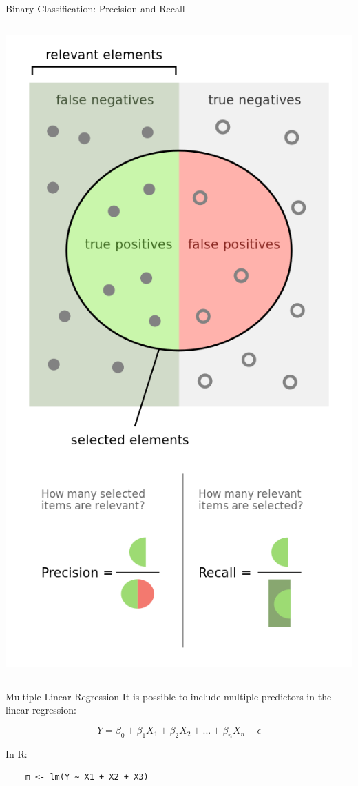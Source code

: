 \begin{frame}{Binary Classification: Precision and Recall}
\begin{columns}
\begin{column}{0.4\linewidth}
            \includegraphics[width=0.95\linewidth]{gfx/precisionrecall}
        \end{column}
    \end{columns}
\end{frame}

\begin{frame}[fragile]{Multiple Linear Regression}
    It is possible to include multiple predictors in the linear regression:
    
    \begin{equation*}
    Y = \beta_0 + \beta_1 X_1 + \beta_2 X_2 + ... + \beta_n X_n + \epsilon
    \end{equation*}

    In R:
    \begin{verbatim}
    m <- lm(Y ~ X1 + X2 + X3)
    \end{verbatim}
\end{frame}

